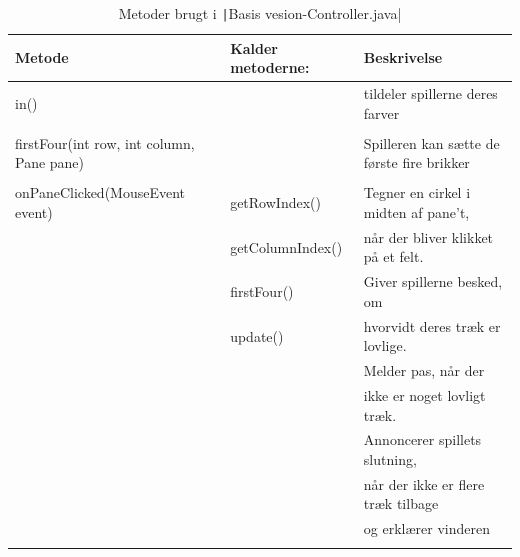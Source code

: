\subsubsection{}
\begin{table}[H]
    \centering
    \caption{Metoder brugt i \texttt|Basis vesion-Controller.java|}\label{tbl:1}
    \begin{tabular}{lll}
        \toprule
    Metode          & Kalder metoderne: & Beskrivelse                                                         \\
        \midrule
       in()         &   & tildeler spillerne deres farver
             \\
             \\
        firstFour(int row, int column, Pane pane)   &  & Spilleren kan sætte de første fire brikker
        \\
        \\
         onPaneClicked(MouseEvent event) & getRowIndex()     & Tegner en cirkel i midten af pane't,                                         \\
                        & getColumnIndex()  & når der bliver klikket på et felt.                                     \\
                        & firstFour()       & Giver spillerne besked, om                                        \\
                        & update()  & hvorvidt deres træk er lovlige.                                    \\
                        &                & Melder pas, når der                                               \\
                        &                & ikke er noget lovligt træk.                                        \\
                        &                     & Annoncerer spillets slutning,                                     \\
                        &                   & når der ikke er flere træk tilbage                                                  \\
                        &                    & og erklærer vinderen                                      \\
                        &                   &                                                                   \\
                        

\end{tabular}
\end{table}
